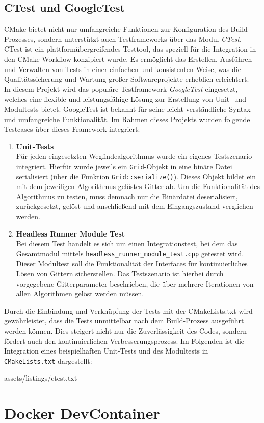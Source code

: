 \subsection{CTest und GoogleTest}
\label{subsec:ctest-integration}
CMake bietet nicht nur umfangreiche Funktionen zur Konfiguration des Build-Prozesses, sondern unterstützt auch Testframeworks über das Modul \textit{CTest}.
CTest ist ein plattformübergreifendes Testtool, das speziell für die Integration in den CMake-Workflow konzipiert wurde.
Es ermöglicht das Erstellen, Ausführen und Verwalten von Tests in einer einfachen und konsistenten Weise, was die Qualitätssicherung und Wartung großer Softwareprojekte erheblich erleichtert.\\
In diesem Projekt wird das populäre Testframework \textit{GoogleTest} eingesetzt, welches eine flexible und leistungsfähige Lösung zur Erstellung von Unit- und Modultests bietet.
GoogleTest ist bekannt für seine leicht verständliche Syntax und umfangreiche Funktionalität.
Im Rahmen dieses Projekts wurden folgende Testcases über dieses Framework integriert:
\begin{enumerate}
    \item \textbf{Unit-Tests}\\
    Für jeden eingesetzten Wegfindealgorithmus wurde ein eigenes Testszenario integriert.
    Hierfür wurde jeweils ein \texttt{Grid}-Objekt in eine binäre Datei serialisiert (über die Funktion \texttt{Grid::serialize()}).
    Dieses Objekt bildet ein mit dem jeweiligen Algorithmus gelöstes Gitter ab.
    Um die Funktionalität des Algorithmus zu testen, muss demnach nur die Binärdatei deserialisiert, zurückgesetzt, gelöst und anschließend mit dem Eingangszustand verglichen werden.
    \item \textbf{Headless Runner Module Test}\\
    Bei diesem Test handelt es sich um einen Integrationstest, bei dem das Gesamtmodul mittels \texttt{headless\_runner\_module\_test.cpp} getestet wird.
    Dieser Modultest soll die Funktionalität der Interfaces für kontinuierliches Lösen von Gittern sicherstellen.
    Das Testszenario ist hierbei durch vorgegebene Gitterparameter beschrieben, die über mehrere Iterationen von allen Algorithmen gelöst werden müssen.
\end{enumerate}
Durch die Einbindung und Verknüpfung der Tests mit der CMakeLists.txt wird gewährleistet, dass die Tests unmittelbar nach dem Build-Prozess ausgeführt werden können.
Dies steigert nicht nur die Zuverlässigkeit des Codes, sondern fördert auch den kontinuierlichen Verbesserungsprozess.
Im Folgenden ist die Integration eines beispielhaften Unit-Tests und des Modultests in \texttt{CMakeLists.txt} dargestellt:

{assets/listings/ctest.txt}


\section{Docker DevContainer}
\label{sec:tooling-docker}
